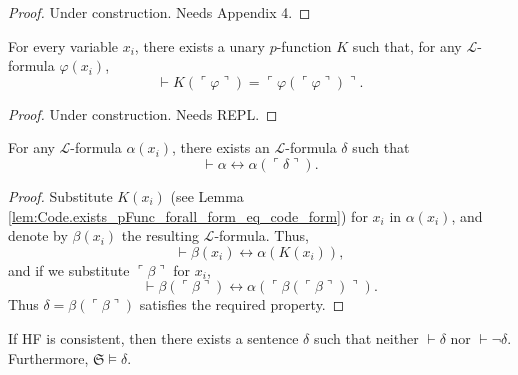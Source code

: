 \begin{proof}
    Under construction. Needs Appendix 4.
\end{proof}

\begin{lemma}
    \label{lem:Code.exists_pFunc_forall_form_eq_code_form}
    For every variable $x_i$, there exists a unary $p$-function $K$ such that, 
    for any $\mathcal{L}$-formula $\varphi(x_i)$,
    $$
    \vdash K (\ulcorner{\varphi}\urcorner) = 
    \ulcorner{\varphi(\ulcorner {\varphi} \urcorner)}\urcorner.
    $$
\end{lemma}

\begin{proof}
    Under construction. Needs REPL.
\end{proof}

\begin{theorem}
    \label{thm:diagonal}
    \leanok
    For any $\mathcal{L}$-formula $\alpha(x_i)$, there exists an $\mathcal{L}$-formula 
    $\delta$ such that 
    $$
    \vdash \alpha \leftrightarrow \alpha(\ulcorner{\delta}\urcorner).
    $$
\end{theorem}

\begin{proof}
    Substitute $K(x_i)$ (see Lemma \ref{lem:Code.exists_pFunc_forall_form_eq_code_form}) 
    for $x_i$ in $\alpha(x_i)$, and denote by $\beta(x_i)$ the resulting $\mathcal{L}$-formula.
    Thus,
    $$
    \vdash \beta(x_i) \leftrightarrow \alpha(K(x_i)),
    $$
    and if we substitute $\ulcorner{\beta}\urcorner$ for $x_i$, 
    $$
    \vdash \beta(\ulcorner{\beta}\urcorner) \leftrightarrow 
    \alpha(\ulcorner{\beta(\ulcorner{\beta}\urcorner)}\urcorner).
    $$
    Thus $\delta = \beta(\ulcorner{\beta}\urcorner)$ satisfies the required property.
\end{proof}

\begin{theorem}
    \label{thm:first_incompleteness}
    \leanok
    If HF is consistent, then there exists a sentence $\delta$ such that
    neither $\vdash \delta$ nor $\vdash \neg \delta$. 
    Furthermore, $\mathfrak{S} \vDash \delta$.
\end{theorem}

